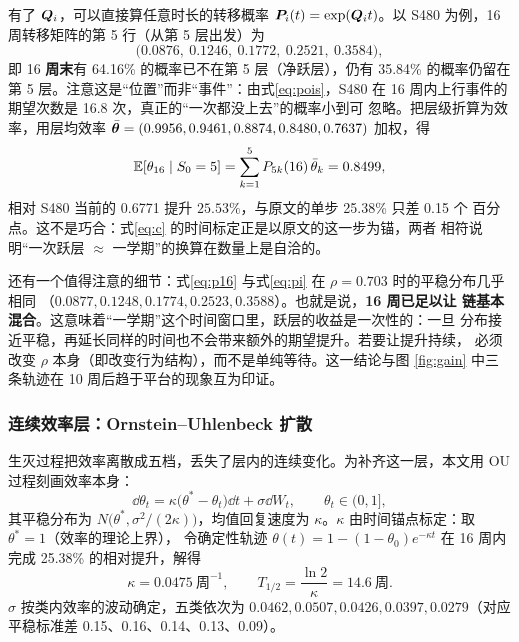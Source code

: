 有了 $\bm{Q}_i$，可以直接算任意时长的转移概率 $\bm{P}_i(t)=\exp(\bm{Q}_i t)$。以
S480 为例，16 周转移矩阵的第 5 行（从第 5 层出发）为
\begin{equation}
\bigl(0.0876,\ 0.1246,\ 0.1772,\ 0.2521,\ 0.3584\bigr),
\label{eq:p16}
\end{equation}
即 16 \textbf{周末}有 64.16\% 的概率已不在第 5 层（净跃层），仍有 35.84\%
的概率仍留在第 5 层。注意这是“位置”而非“事件”：由式\eqref{eq:pois}，S480
在 16 周内上行事件的期望次数是 16.8 次，真正的“一次都没上去”的概率小到可
忽略。把层级折算为效率，用层均效率
$\bar{\bm{\theta}}=(0.9956,0.9461,0.8874,0.8480,0.7637)$ 加权，得
\begin{equation}
\mathbb{E}[\theta_{16}\mid S_0=5]=\sum_{k=1}^{5}P_{5k}(16)\,\bar\theta_k=0.8499,
\label{eq:etheta}
\end{equation}
相对 S480 当前的 0.6771 提升 $25.53\%$，与原文的单步 25.38\% 只差 0.15 个
百分点。这不是巧合：式\eqref{eq:c} 的时间标定正是以原文的这一步为锚，两者
相符说明“一次跃层 $\approx$ 一学期”的换算在数量上是自洽的。

还有一个值得注意的细节：式\eqref{eq:p16} 与式\eqref{eq:pi} 在
$\rho=0.703$ 时的平稳分布几乎相同
（$0.0877,0.1248,0.1774,0.2523,0.3588$）。也就是说，\textbf{16 周已足以让
链基本混合}。这意味着“一学期”这个时间窗口里，跃层的收益是一次性的：一旦
分布接近平稳，再延长同样的时间也不会带来额外的期望提升。若要让提升持续，
必须改变 $\rho$ 本身（即改变行为结构），而不是单纯等待。这一结论与图
\ref{fig:gain} 中三条轨迹在 10 周后趋于平台的现象互为印证。

\subsubsection{连续效率层：Ornstein--Uhlenbeck 扩散}

生灭过程把效率离散成五档，丢失了层内的连续变化。为补齐这一层，本文用
OU 过程刻画效率本身：
\begin{equation}
\dd\theta_t=\kappa\bigl(\theta^{*}-\theta_t\bigr)\dd t+\sigma\dd W_t,
\qquad \theta_t\in(0,1],
\label{eq:ou2}
\end{equation}
其平稳分布为 $N\bigl(\theta^{*},\sigma^2/(2\kappa)\bigr)$，均值回复速度为
$\kappa$。$\kappa$ 由时间锚点标定：取 $\theta^{*}=1$（效率的理论上界），
令确定性轨迹 $\theta(t)=1-(1-\theta_0)e^{-\kappa t}$ 在 16 周内完成
25.38\% 的相对提升，解得
\begin{equation}
\kappa=0.0475\ \text{周}^{-1},\qquad T_{1/2}=\frac{\ln2}{\kappa}=14.6\ \text{周}.
\label{eq:kappa}
\end{equation}
$\sigma$ 按类内效率的波动确定，五类依次为 $0.0462,0.0507,0.0426,
0.0397,0.0279$（对应平稳标准差 0.15、0.16、0.14、0.13、0.09）。

